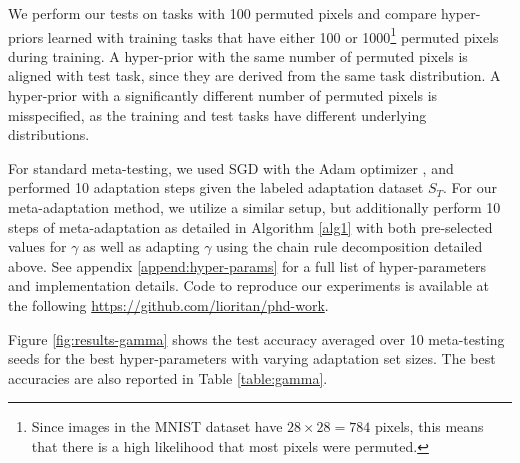 \documentclass{article}
\theoremstyle{definition}
\newcommand{\LF}[1]{\textcolor{blue}{\{LF: #1\}}}
\begin{document}
We perform our tests on tasks with 100 permuted pixels and compare hyper-priors learned with training tasks that have either 100 or 1000\footnote{Since images in the MNIST dataset have $28\times 28=784$ pixels, this means that there is a high likelihood that most pixels were permuted.} permuted pixels during training. 
A hyper-prior with the same number of permuted pixels is aligned with test task, since they are derived from the same task distribution. A hyper-prior with a significantly different number of permuted pixels is misspecified, as the training and test tasks have different underlying distributions.

For standard meta-testing, we used SGD with the Adam optimizer \citep{Kingma2015}, and performed 10 adaptation steps given the labeled adaptation dataset $S_T$. For our meta-adaptation method, we utilize a similar setup, but additionally perform 10 steps of meta-adaptation as detailed in Algorithm \ref{alg1} with both pre-selected values for $\gamma$ as well as adapting $\gamma$ using the chain rule decomposition detailed above. See appendix \ref{append:hyper-params} for a full list of hyper-parameters and implementation details. Code to reproduce our experiments is available at the following \hyperlink{Github repository}{https://github.com/lioritan/phd-work}.


Figure \ref{fig:results-gamma} shows the test accuracy averaged over 10 meta-testing seeds for the best hyper-parameters with varying adaptation set sizes. The best accuracies are also reported in Table \ref{table:gamma}.
\end{document}
